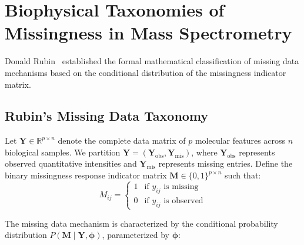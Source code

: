 \documentclass[11pt,oneside]{book}
\begin{document}
\section{Biophysical Taxonomies of Missingness in Mass Spectrometry}

Donald Rubin~\cite{rubin1976inference} established the formal mathematical classification of missing data mechanisms based on the conditional distribution of the missingness indicator matrix.

\subsection{Rubin's Missing Data Taxonomy}

Let $\mathbf{Y} \in \mathbb{R}^{p \times n}$ denote the complete data matrix of $p$ molecular features across $n$ biological samples. We partition $\mathbf{Y} = (\mathbf{Y}_{\text{obs}}, \mathbf{Y}_{\text{mis}})$, where $\mathbf{Y}_{\text{obs}}$ represents observed quantitative intensities and $\mathbf{Y}_{\text{mis}}$ represents missing entries. Define the binary missingness response indicator matrix $\mathbf{M} \in \{0, 1\}^{p \times n}$ such that:
\begin{equation}
M_{ij} = \begin{cases} 1 & \text{if } y_{ij} \text{ is missing} \\ 0 & \text{if } y_{ij} \text{ is observed} \end{cases}
\end{equation}

The missing data mechanism is characterized by the conditional probability distribution $P(\mathbf{M} \mid \mathbf{Y}, \boldsymbol{\phi})$, parameterized by $\boldsymbol{\phi}$:
\end{document}
